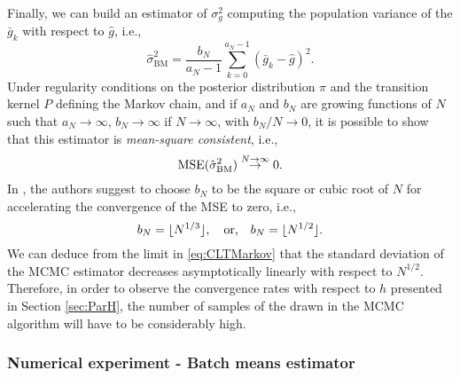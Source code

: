 Finally, we can build an estimator of $\sigma_g^2$ computing the population variance of the $\bar g_k$ with respect to $\hat g$, i.e.,
\begin{equation}
	\hat\sigma^2_{\mathrm{BM}} = \frac{b_N}{a_N - 1} \sum_{k=0}^{a_N -1}(\bar g_k - \hat g)^2. 
\end{equation}
Under regularity conditions on the posterior distribution $\pi$ and the transition kernel $P$ defining the Markov chain, and if $a_N$ and $b_N$ are growing functions of $N$ such that $a_N \to \infty$, $b_N \to \infty$ if $N \to \infty$, with $b_N / N \to 0$, it is possible to show \cite{FlJ10} that this estimator is \textit{mean-square consistent}, i.e.,
\begin{equation}
	\operatorname{MSE}(\hat\sigma^2_{\mathrm{BM}}) \stackrel{N\to\infty}{\to} 0.
\end{equation}
In \cite{FlJ10}, the authors suggest to choose $b_N$ to be the square or cubic root of $N$ for accelerating the convergence of the MSE to zero, i.e.,
\begin{equation}
	b_N = \lfloor N^{1/3}\rfloor, \quad \text{or,} \quad b_N = \lfloor N^{1/2}\rfloor.
\end{equation}
We can deduce from the limit in \eqref{eq:CLTMarkov} that the standard deviation of the MCMC estimator decreases asymptotically linearly with respect to $N^{1/2}$. Therefore, in order to observe the convergence rates with respect to $h$ presented in Section \ref{sec:ParH}, the number of samples of the drawn in the MCMC algorithm will have to be considerably high.

\subsubsection{Numerical experiment - Batch means estimator}

